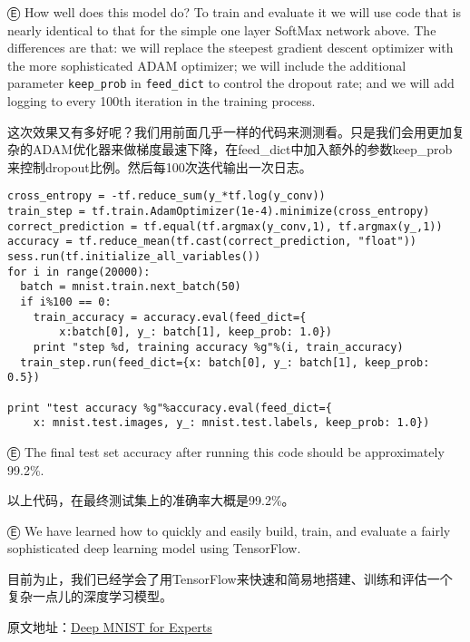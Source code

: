 Ⓔ \textcolor{etc}{How well does this model do? To train and evaluate it we will use code that is nearly identical to that for the simple one layer SoftMax network above. The differences are that: we will replace the steepest gradient descent optimizer with the more sophisticated ADAM optimizer; we will include the additional parameter \lstinline{keep_prob} in \lstinline{feed_dict} to control the dropout rate; and we will add logging to every 100th iteration in the training process.}

这次效果又有多好呢？我们用前面几乎一样的代码来测测看。只是我们会用更加复杂的ADAM优化器来做梯度最速下降，在feed\_dict中加入额外的参数keep\_prob来控制dropout比例。然后每100次迭代输出一次日志。

\begin{lstlisting}
cross_entropy = -tf.reduce_sum(y_*tf.log(y_conv))
train_step = tf.train.AdamOptimizer(1e-4).minimize(cross_entropy)
correct_prediction = tf.equal(tf.argmax(y_conv,1), tf.argmax(y_,1))
accuracy = tf.reduce_mean(tf.cast(correct_prediction, "float"))
sess.run(tf.initialize_all_variables())
for i in range(20000):
  batch = mnist.train.next_batch(50)
  if i%100 == 0:
    train_accuracy = accuracy.eval(feed_dict={
        x:batch[0], y_: batch[1], keep_prob: 1.0})
    print "step %d, training accuracy %g"%(i, train_accuracy)
  train_step.run(feed_dict={x: batch[0], y_: batch[1], keep_prob: 0.5})

print "test accuracy %g"%accuracy.eval(feed_dict={
    x: mnist.test.images, y_: mnist.test.labels, keep_prob: 1.0})
\end{lstlisting}

Ⓔ \textcolor{etc}{The final test set accuracy after running this code should be approximately 99.2\%.}

以上代码，在最终测试集上的准确率大概是99.2\%。

Ⓔ \textcolor{etc}{We have learned how to quickly and easily build, train, and evaluate a fairly sophisticated deep learning model using TensorFlow.}

目前为止，我们已经学会了用TensorFlow来快速和简易地搭建、训练和评估一个复杂一点儿的深度学习模型。

原文地址：\href{https://www.tensorflow.org/versions/master/tutorials/mnist/pros/index.html#deep-mnist-for-experts}{Deep MNIST for Experts}
